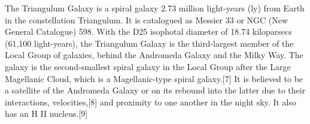 The Triangulum Galaxy is a spiral galaxy 2.73 million light-years (ly) from Earth in the constellation Triangulum. It is catalogued as Messier 33 or NGC (New General Catalogue) 598. With the D25 isophotal diameter of 18.74 kiloparsecs (61,100 light-years), the Triangulum Galaxy is the third-largest member of the Local Group of galaxies, behind the Andromeda Galaxy and the Milky Way. The galaxy is the second-smallest spiral galaxy in the Local Group after the Large Magellanic Cloud, which is a Magellanic-type spiral galaxy.[7] It is believed to be a satellite of the Andromeda Galaxy or on its rebound into the latter due to their interactions, velocities,[8] and proximity to one another in the night sky. It also has an H II nucleus.[9]
